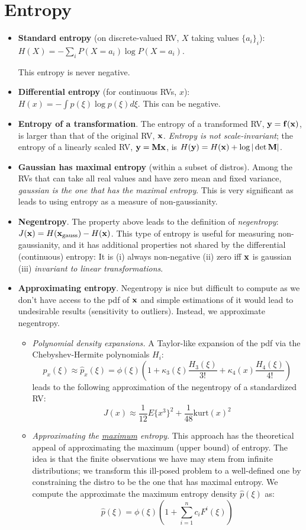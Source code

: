 \documentclass[a4paper, one	side]{book}
\begin{document}
\section{Entropy}
\begin{itemize}
\item \textbf{Standard entropy} (\ie on discrete-valued RV, $X$ taking values $\{a_i\}_i$): $H(X)=-\sum_i P(X=a_i)\log P(X=a_i)$.

This entropy is never negative.
\item \textbf{Differential entropy} (for continuous RVs, $x$): $H(x) = -\int p(\xi) \log p(\xi) d\xi$. This can be negative.

\item \textbf{Entropy of a transformation}. The entropy of a transformed RV, \eg $\mathbf{y}=\mathbf{f(x)}$, is larger than that of the original RV, $\mathbf{x}$. \textit{Entropy is not scale-invariant}; the entropy of a linearly scaled RV, $\mathbf{y}=\mathbf{Mx}$, is $H(\mathbf y) = H(\mathbf x) + \log |\det \mathbf M|$.

\item \textbf{Gaussian has maximal entropy} (within a subset of distros). Among the RVs that can take all real values and have zero mean and fixed variance, \textit{gaussian is the one that has the maximal entropy}. This is very significant as leads to using entropy as a measure of non-gaussianity. 

\item \textbf{Negentropy}. The property above leads to the definition of \textit{negentropy}: $J(\mathbf{x})=H(\mathbf x_{\text{gauss}})-H(\mathbf x)$. This type of entropy is useful for measuring non-gaussianity, and it has additional properties not shared by the differential (\ie continuous) entropy:  It is (i) always non-negative (ii) zero iff $\mathbf x$ is gaussian (iii) \textit{invariant to linear transformations}.

\item \textbf{Approximating entropy}. Negentropy is nice but difficult to compute as we don't have access to the pdf of $\mathbf x$ and simple estimations of it would lead to undesirable results (\eg sensitivity to outliers). Instead, we approximate negentropy. 
	\begin{itemize}
	\item \textit{Polynomial density expansions.} A Taylor-like expansion of the pdf via the Chebyshev-Hermite polynomials $H_i$: $$p_x(\xi)\approx \hat{p}_x(\xi)=\phi(\xi)\left(1+\kappa_3(\xi) \frac{H_3(\xi)}{3!} + \kappa_4(x)\frac{H_4(\xi)}{4!}\right)$$
	leads to the following approximation of the negentropy of a standardized RV: $$J(x) \approx \frac{1}{12}E\{x^3\}^2 + \frac{1}{48}\text{kurt}(x)^2$$ 
	\item \textit{Approximating the \underline{maximum} entropy}. This approach has the theoretical appeal of approximating the maximum (\ie upper bound) of entropy. The idea is that the finite observations we have may stem from infinite distributions; we transform this ill-posed problem to a well-defined one by constraining the distro to be the one that has maximal entropy. We compute the approximate the maximum entropy density $\hat{p}(\xi)$ as: $$ \hat{p}(\xi) = \phi(\xi)\left( 1+ \sum\limits_{i=1}^n  c_i F^i (\xi) \right)$$
	

\end{itemize}
\end{itemize}
\end{document}
